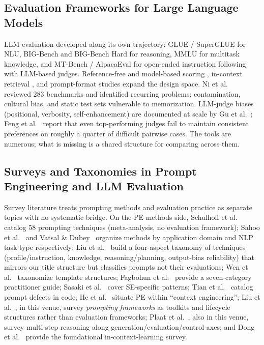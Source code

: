 \documentclass[acmsmall, nonacm, screen]{acmart}
\begin{document}
\subsection{Evaluation Frameworks for Large Language Models}

LLM evaluation developed along its own trajectory: GLUE
\cite{wang2018glue} / SuperGLUE \cite{wang2019superglue} for NLU,
BIG-Bench \cite{srivastava2022bigbench} and BIG-Bench Hard
\cite{cot_benchmark2022} for reasoning, MMLU
\cite{hendrycks2021measuring} for multitask knowledge, and MT-Bench /
AlpacaEval \cite{zheng2023judging, dubois2024alpacaeval} for open-ended
instruction following with LLM-based judges. Reference-free and
model-based scoring \cite{multidimeval2022, instructscore2023,
beyondpointwise2025, nlgevalstatus2024}, in-context retrieval
\cite{incalm2023}, and prompt-format studies
\cite{promptformat2024} expand the design space. Ni et
al.~\cite{ni2025benchmarks} reviewed 283 benchmarks and identified
recurring problems: contamination, cultural bias, and static test
sets vulnerable to memorization. LLM-judge biases (positional,
verbosity, self-enhancement) are documented at scale by Gu et
al.~\cite{gu2025llmjudge}; Feng et al.~\cite{feng2025sage} report
that even top-performing judges fail to maintain consistent
preferences on roughly a quarter of difficult pairwise cases. The
tools are numerous; what is missing is a shared structure for
comparing across them.

\subsection{Surveys and Taxonomies in Prompt Engineering and LLM Evaluation}

Survey literature treats prompting methods and evaluation practice as
separate topics with no systematic bridge. On the PE methods side,
Schulhoff et al.~\cite{schulhoff2024prompt} catalog 58 prompting
techniques (meta-analysis, no evaluation framework); Sahoo et
al.~\cite{sahoo2024systematic} and Vatsal \&
Dubey~\cite{vatsal2024survey} organize methods by application domain
and NLP task type respectively; Liu et al.~\cite{liu2026taxonomy}
build a four-aspect taxonomy of techniques (profile/instruction,
knowledge, reasoning/planning, output-bias reliability) that mirrors
our title structure but classifies prompts not their evaluations;
Wen et al.~\cite{pettax2025} taxonomize template structures;
Fagbohun et al.~\cite{fagbohun2024categorization} provide a
seven-category practitioner guide; Sasaki et al.~\cite{petaxse2025}
cover SE-specific patterns; Tian et al.~\cite{petaxdefects2025}
catalog prompt defects in code; He et al.~\cite{contextengineer2025}
situate PE within ``context engineering''; Liu et
al.~\cite{liu2024promptingframeworks}, in this venue, survey
\emph{prompting frameworks} as toolkits and lifecycle structures
rather than evaluation frameworks; Plaat et
al.~\cite{plaat2024multistep}, also in this venue, survey
multi-step reasoning along generation/evaluation/control axes; and
Dong et al.~\cite{dong2022survey} provide the foundational
in-context-learning survey.
\end{document}
